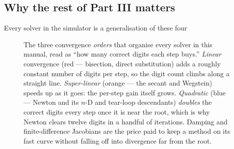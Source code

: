 \documentclass[11pt,a4paper]{article}
\begin{document}
\subsection{Why the rest of Part III matters}

Every solver in the simulator is a generalisation of these four

\begin{figure}[ht]
\centering
{}
\caption{The three convergence \emph{orders} that organise every solver
in this manual, read as ``how many correct digits each step buys.''
\emph{Linear} convergence (red --- bisection, direct substitution) adds a
roughly constant number of digits per step, so the digit count climbs
along a straight line.  \emph{Super-linear} (orange --- the secant and
Wegstein) speeds up as it goes: the per-step gain itself grows.
\emph{Quadratic} (blue --- Newton and its $n$-D and tear-loop
descendants) \emph{doubles} the correct digits every step once it is
near the root, which is why Newton clears twelve digits in a handful of
iterations.  Damping and finite-difference Jacobians are the price paid
to keep a method on its fast curve without falling off into divergence
far from the root.}
\label{fig:convergence-orders}
\end{figure}
\end{document}
